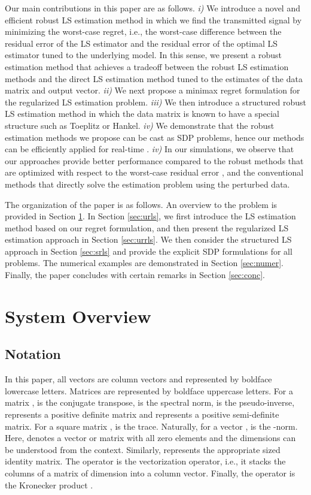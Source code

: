\documentclass[review,sort&compress]{elsarticle}
\begin{document}
Our main contributions in this paper are as follows. {\em i)} We introduce a novel and efficient robust LS estimation method in which we find the transmitted signal by minimizing the worst-case regret, i.e., the worst-case difference
between the residual error of the LS estimator and the residual error of the optimal LS estimator tuned to the underlying model. In this sense, we present a robust estimation method that achieves a tradeoff between the robust LS estimation methods and the direct LS estimation method tuned to the estimates of the data matrix and output vector. {\em ii)} We next propose a minimax regret formulation for the regularized LS estimation problem. {\em iii)} We then introduce a structured robust LS estimation method in which the data matrix is known to have a special structure such as Toeplitz or Hankel. {\em iv)} We demonstrate that the robust estimation methods we propose can be cast as SDP problems, hence our methods can be efficiently applied for real-time \cite{boyd}. {\em iv)} In our simulations, we observe that our approaches provide better performance compared to the robust methods that are optimized with respect to the worst-case residual error \cite{est1, est2}, and the conventional methods that directly solve the estimation problem using the perturbed data.

The organization of the paper is as follows. An overview to the problem is provided in Section \ref{sec:system}. In Section \ref{sec:urls}, we first introduce the LS estimation method based on our regret formulation, and then present the regularized LS estimation approach in Section \ref{sec:urrls}. We then consider the structured LS approach in Section \ref{sec:srls} and provide the explicit SDP formulations for all problems. The numerical examples are demonstrated in Section \ref{sec:numer}. Finally, the paper concludes with certain remarks in Section \ref{sec:conc}.

\section{System Overview} \label{sec:system}
\subsection{Notation}
In this paper, all vectors are column vectors and represented by boldface lowercase letters. Matrices are represented by boldface uppercase letters. For a matrix ,  is the conjugate transpose,  is the spectral norm,  is the pseudo-inverse,  represents a positive definite matrix and  represents a positive semi-definite matrix. For a square matrix ,  is the trace. Naturally, for a vector ,  is the -norm. Here,  denotes a vector or matrix with all zero elements and the dimensions can be understood from the context. Similarly,  represents the appropriate sized identity matrix. The operator  is the vectorization operator, i.e., it stacks the columns of a matrix of dimension  into a  column vector. Finally, the operator  is the Kronecker product \cite{graham}.
\end{document}
